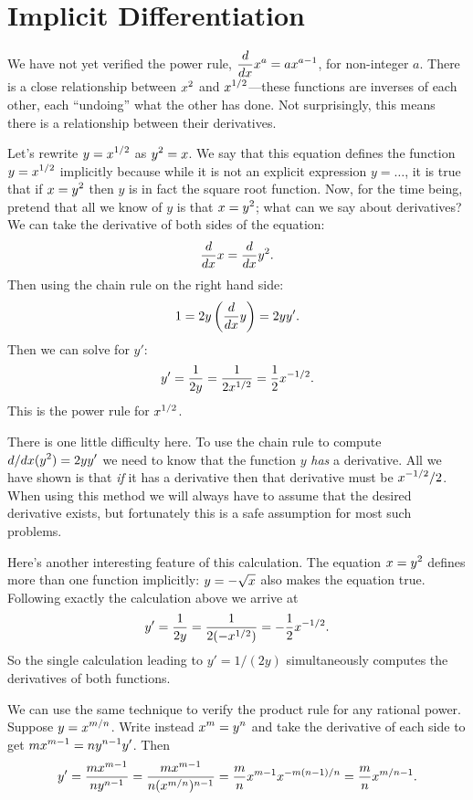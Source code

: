\section{Implicit Differentiation}{}{}
\nobreak
\iflatetranscendentals
We have not yet verified the power rule, $\displaystyle{d\over dx}x^a=ax^{a-1}$,
for non-integer $a$.
There is a close relationship between $\displaystyle x^2$ and $\displaystyle x^{1/2}$---these
functions are inverses of each other, each ``undoing'' what the other
has done. Not surprisingly, this means there is a relationship between
their derivatives.

Let's rewrite $\displaystyle y=x^{1/2}$ as $\displaystyle y^2 = x$.
We say that this equation
defines the function $\displaystyle y=x^{1/2}$ 
implicitly
because while it is not an explicit expression $y=\ldots$, it is true
that if $\displaystyle x=y^2$ then $y$ is in fact the square root function.
Now, for the time being, pretend that all we know of $y$ is
that $\displaystyle x=y^2$; what can we say about derivatives? We can take the
derivative of both sides of the equation:
$${d\over dx}x={d\over dx}y^2.$$
Then using the chain rule on the right hand side:
$$1 = 2y\left({d\over dx}y\right) = 2yy'.$$
Then we can solve for $y'$:
$$y'={1\over 2y} = {1\over 2x^{1/2}}={1\over2}x^{-1/2}.$$
This is the power rule for $\displaystyle x^{1/2}$.

There is one little difficulty here. To use the chain rule to compute 
$\displaystyle d/dx(y^2)=2yy'$ we need to know that the function $y$ {\em has\/} a
derivative. All we have shown is that {\em if\/} it has a derivative
then that derivative must be $\displaystyle x^{-1/2}/2$. When using this method we will
always have to assume that the desired derivative exists, but
fortunately this is a safe assumption for most such problems. 

Here's another interesting feature of this calculation. The equation
$\displaystyle x=y^2$ defines more than one function implicitly: $\displaystyle y=-\sqrt{x}$ also
makes the equation true. Following exactly the calculation above we
arrive at
$$y'={1\over 2y} = {1\over 2(-x^{1/2})}=-{1\over2}x^{-1/2}.$$
So the single calculation leading to $y'=1/(2y)$ simultaneously
computes the derivatives of both functions.

We can use the same technique to verify the product rule for any
rational power. Suppose $\displaystyle y=x^{m/n}$. Write instead $\displaystyle x^m=y^n$ and take
the derivative of each side to get $\displaystyle mx^{m-1}=ny^{n-1}y'$. Then 
$$y'={mx^{m-1}\over ny^{n-1}}={mx^{m-1}\over n(x^{m/n})^{n-1}}=
{m\over n}x^{m-1}x^{-m(n-1)/n}={m\over n}x^{m/n-1}.$$

